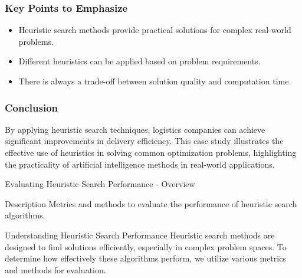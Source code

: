 \documentclass[aspectratio=169]{beamer}
\begin{document}
\begin{frame}[fragile]
    \frametitle{Key Points to Emphasize}
    \begin{itemize}
        \item Heuristic search methods provide practical solutions for complex real-world problems.
        \item Different heuristics can be applied based on problem requirements.
        \item There is always a trade-off between solution quality and computation time.
    \end{itemize}
\end{frame}

\begin{frame}[fragile]
    \frametitle{Conclusion}
    By applying heuristic search techniques, logistics companies can achieve significant improvements in delivery efficiency. 
    This case study illustrates the effective use of heuristics in solving common optimization problems, highlighting the practicality of artificial intelligence methods in real-world applications.
\end{frame}

\begin{frame}[fragile]{Evaluating Heuristic Search Performance - Overview}
    \begin{block}{Description}
        Metrics and methods to evaluate the performance of heuristic search algorithms.
    \end{block}
\end{frame}

\begin{frame}[fragile]{Understanding Heuristic Search Performance}
    Heuristic search methods are designed to find solutions efficiently, especially in complex problem spaces. 
    To determine how effectively these algorithms perform, we utilize various metrics and methods for evaluation.
\end{frame}
\end{document}

